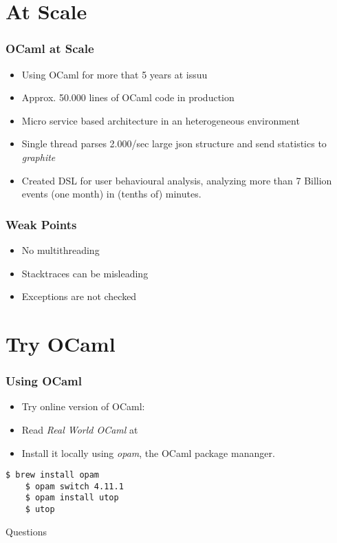 \documentclass[xcolor=svgnames]{beamer}
\renewcommand{\emph}[1]{{\em #1}}
\renewcommand{\_}{\mathunderscore}
\begin{document}

\section{At Scale}
\begin{frame}[fragile]
  \frametitle{OCaml at Scale}
  \begin{itemize}
  \item Using OCaml for more that 5 years at issuu
  \item Approx. 50.000 lines of OCaml code in production
  \item Micro service based architecture in an heterogeneous environment
  \item Single thread parses 2.000/sec large json structure and send
    statistics to \textit{graphite}
  \item Created DSL for user behavioural analysis, analyzing more than
    7 Billion events (one month) in (tenths of) minutes.
  \end{itemize}
\end{frame}

\begin{frame}[fragile]
  \frametitle{Weak Points}
  \begin{itemize}
  \item No multithreading
  \item Stacktraces can be misleading
  \item Exceptions are not checked
  \end{itemize}
\end{frame}

\section{Try OCaml}
\begin{frame}[fragile]
  \frametitle{Using OCaml}
  \begin{itemize}
    \item Try online version of OCaml: 
    \item Read \emph{Real World OCaml} at 
    \item Install it locally using \emph{opam}, the OCaml package mananger.
  \end{itemize}
  \begin{lstlisting}[numbers=none,frame=none]
    $ brew install opam
    $ opam switch 4.11.1
    $ opam install utop
    $ utop
  \end{lstlisting}
\end{frame}

\begin{frame}[fragile]
  \begin{center}
    \LARGE Questions
  \end{center}
\end{frame}
\end{document}
